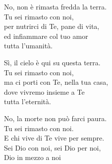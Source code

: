 

\spazio

\strofa No, non è rimasta fredda la terra.\\
Tu sei rimasto con noi,\\
per nutrirci di Te, pane di vita,\\
ed infiammare col tuo amor\\
tutta l'umanità.

\spazio


\spazio

\strofa Sì, il cielo è qui su questa terra.\\
Tu sei rimasto con noi,\\
ma ci porti con Te, nella tua casa,\\
dove vivremo insieme a Te\\
tutta l'eternità.

\spazio


\spazio

\strofa No, la morte non può farci paura.\\
Tu sei rimasto con noi.\\
E chi vive di Te vive per sempre.\\
Sei Dio con noi, sei Dio per noi,\\
Dio in mezzo a noi

\spazio

